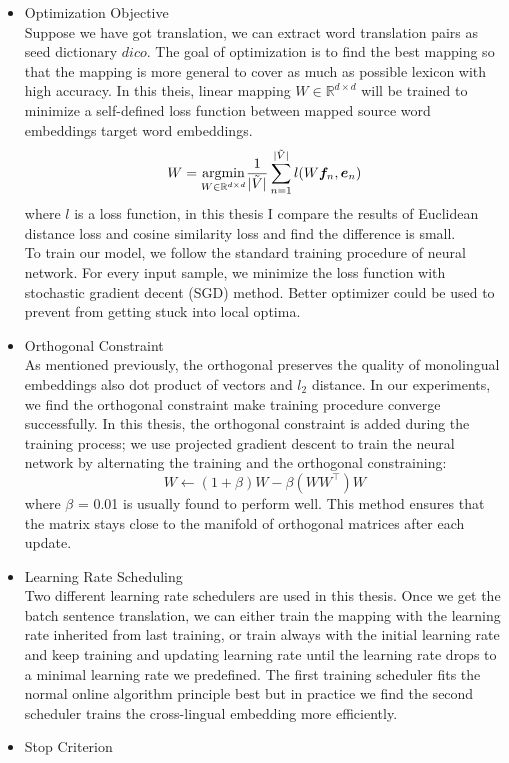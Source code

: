 \begin{itemize}
	
	\item Optimization Objective \\
	Suppose we have got translation, we can extract word translation pairs as seed dictionary $dico$. The goal of optimization is to find the best mapping so that the mapping is more general to cover as much as possible lexicon with high accuracy. In this theis, linear mapping $W \in \mathbb{R}^{d \times d}$ will be trained to minimize a self-defined loss function between mapped  source word embeddings target word embeddings.
	\[ W = \underset{W \in \mathbb{R}^{d \times d}}{\operatorname{argmin}} \frac{1}{{\lvert \tilde{V} \rvert}} \sum_{n=1}^{\lvert \tilde{V} \rvert} l(W\bm{f}_n, \bm{e}_n) \]
	where $l$ is a loss function, in this thesis I compare the results of Euclidean distance loss and cosine similarity loss and find the difference is small.\\
	To train our model, we follow the standard training procedure of neural network. For every input sample, we minimize the loss function with stochastic gradient decent (SGD) method. Better optimizer could be used to prevent from getting stuck into local optima.
	\item Orthogonal Constraint\\
	As mentioned previously, the orthogonal preserves the quality of monolingual embeddings also dot product of vectors and  $l_2$ distance. In our experiments, we find the orthogonal constraint make training procedure converge successfully. In this thesis, the orthogonal constraint is added during the training process; we use projected gradient descent to train the neural network by alternating the training and the orthogonal constraining:
\[ W \leftarrow (1+\beta) W - \beta(WW^\top)W\] 
	where $\beta$ = 0.01  is usually found to perform well.  This method ensures that the matrix stays close to the manifold of orthogonal matrices after each update. 	
	\item Learning Rate Scheduling\\
	Two different learning rate schedulers are used in this thesis. Once we get the batch sentence translation, we can either train the mapping with the learning rate inherited from last training, or train always with the initial learning rate and keep training and updating learning rate until the learning rate drops to a minimal learning rate we predefined. The first training scheduler fits the normal online algorithm principle best but in practice we find the second scheduler trains the cross-lingual embedding more efficiently.
	\item Stop Criterion\\

\end{itemize}
